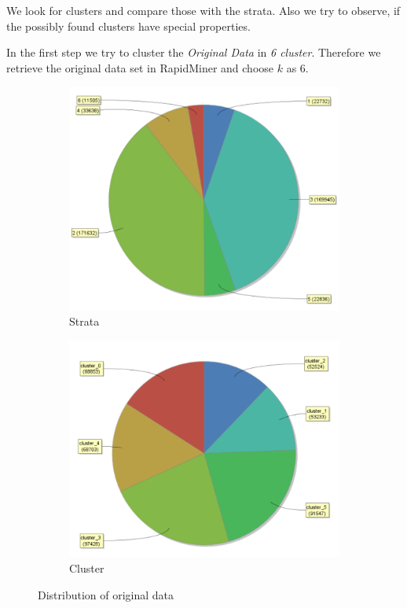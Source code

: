\setlength{\parindent}{0em}
We look for clusters and compare those with the strata. Also we try to observe, if the possibly found clusters have special properties. %

In the first step we try to cluster the \textit{Original Data} in \textit{6 cluster}. Therefore we retrieve the original data set in RapidMiner and choose $k$ as 6.
 
\begin{figure}[!htbp]
\vspace*{-1.5em}
\centering
\begin{subfigure}{.35\textwidth}
  \centering
  \includegraphics[width=.8\linewidth]{ClusterOrigRapidStrata.PNG}
  \caption{Strata}
  \label{fig:OrgSt}
\end{subfigure}%
\begin{subfigure}{.35\textwidth}
  \centering
  \includegraphics[width=.8\linewidth]{ClusterOrigRapidCluster.PNG}
  \caption{Cluster}
  \label{fig:OrgCl}
\end{subfigure}
\caption{Distribution of original data}
\label{fig:OrgDist}
\end{figure}
\vspace*{-1.5em}

